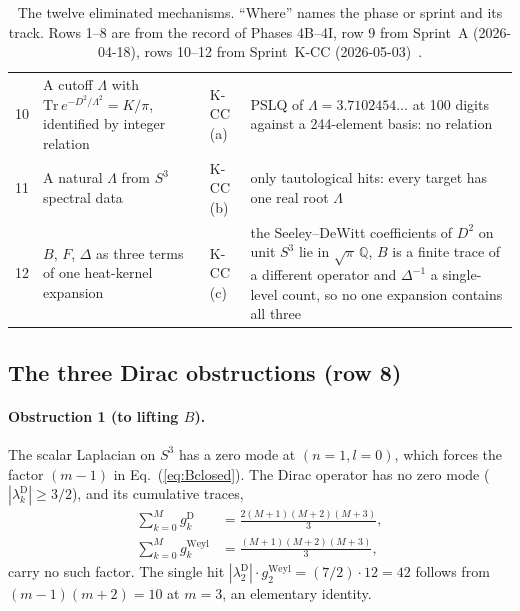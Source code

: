 \documentclass[aps,prl,twocolumn,superscriptaddress]{revtex4-2}
\begin{document}
\begin{table}[tp]
\begin{tabular}{rp{}p{}p{}}
10 & A cutoff $\Lambda$ with $\mathrm{Tr}\,e^{-D^2/\Lambda^2} = K/\pi$, identified by integer relation & K-CC (a) &
 PSLQ of $\Lambda = 3.7102454\ldots$ at 100 digits against a 244-element basis: no relation \\
11 & A natural $\Lambda$ from $S^3$ spectral data & K-CC (b) &
 only tautological hits: every target has one real root $\Lambda$ \\
12 & $B$, $F$, $\Delta$ as three terms of one heat-kernel expansion & K-CC (c) &
 the Seeley--DeWitt coefficients of $D^2$ on unit $S^3$ lie in $\sqrt{\pi}\,\mathbb{Q}$, $B$ is a finite trace of a different operator and $\Delta^{-1}$ a single-level count, so no one expansion contains all three \\
\hline\hline
\end{tabular}
\caption{The twelve eliminated mechanisms. ``Where'' names the phase or
sprint and its track. Rows 1--8 are from the record of Phases
4B--4I, row 9 from Sprint~A (2026-04-18), rows 10--12 from Sprint~K-CC
(2026-05-03)~\cite{alpha_program_record,alpha_sprint_a_memo}.}
\label{tab:mechanisms}
\end{table}

\subsection{The three Dirac obstructions (row 8)}\label{sec:obstructions}

\paragraph{Obstruction 1 (to lifting $B$).}
The scalar Laplacian on $S^3$ has a zero mode at $(n=1, l=0)$, which
forces the factor $(m-1)$ in Eq.~(\ref{eq:Bclosed}). The Dirac operator
has no zero mode ($|\lambda_k^{\mathrm{D}}| \ge 3/2$), and its
cumulative traces,
\begin{align}
  \sum_{k=0}^{M} g_k^{\mathrm{D}}
  &= \frac{2(M+1)(M+2)(M+3)}{3},\\
  \sum_{k=0}^{M} g_k^{\mathrm{Weyl}}
  &= \frac{(M+1)(M+2)(M+3)}{3},
\end{align}
carry no such factor. The single hit
$|\lambda_{2}^{\mathrm{D}}|\cdot g_{2}^{\mathrm{Weyl}} = (7/2)\cdot12 = 42$
follows from $(m-1)(m+2) = 10$ at $m = 3$, an elementary identity.
\end{document}
